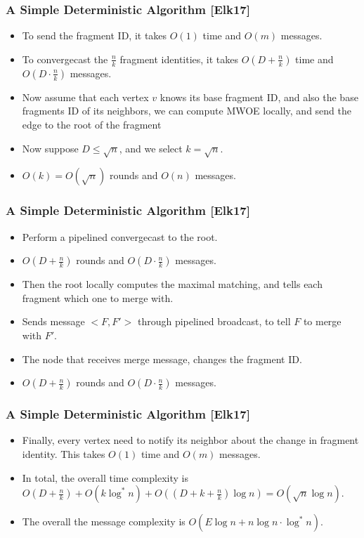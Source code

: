 \begin{frame}
\frametitle{A Simple Deterministic Algorithm [Elk17]}
\begin{itemize}
    \item To send the fragment ID, it takes $O(1)$ time and $O(m)$ messages.
    \item To convergecast the $\frac{n}{k}$ fragment identities, it takes $O(D+\frac{n}{k})$ time and $O(D \cdot\frac{n}{k})$ messages.
    \item Now assume that each vertex $v$ knows its base fragment ID, and also the base fragments ID of its neighbors, we can compute MWOE locally, and send the edge to the root of the fragment
    \item Now suppose $D \le \sqrt{n}$, and we select $k=\sqrt{n}$.
    \item $O(k)=O(\sqrt{n})$ rounds and $O(n)$ messages.
\end{itemize}
\end{frame}

\begin{frame}
\frametitle{A Simple Deterministic Algorithm [Elk17]}
\begin{itemize}
    \item Perform a pipelined convergecast to the root.
    \item $O(D+\frac{n}{k})$ rounds and $O(D \cdot \frac{n}{k})$ messages.
    \item Then the root locally computes the maximal matching, and tells each fragment which one to merge with.
    \item Sends message $<F,F'>$ through pipelined broadcast, to tell $F$ to merge with $F'$.
    \item The node that receives merge message, changes the fragment ID.
    \item $O(D+\frac{n}{k})$ rounds and $O(D \cdot \frac{n}{k})$ messages.
\end{itemize}
\end{frame}

\begin{frame}
\frametitle{A Simple Deterministic Algorithm [Elk17]}
\begin{itemize}
    \item Finally, every vertex need to notify its neighbor about the change in fragment identity. This takes $O(1)$ time and $O(m)$ messages.
    \item In total, the overall time complexity is $O(D+\frac{n}{k}) + O(k\log^* n) + O((D + k + \frac{n}{k})\log n) = O(\sqrt{n}\log n)$.
    \item The overall the message complexity is $O(E \log n + n\log n \cdot \log^* n)$.
\end{itemize}
\end{frame}

